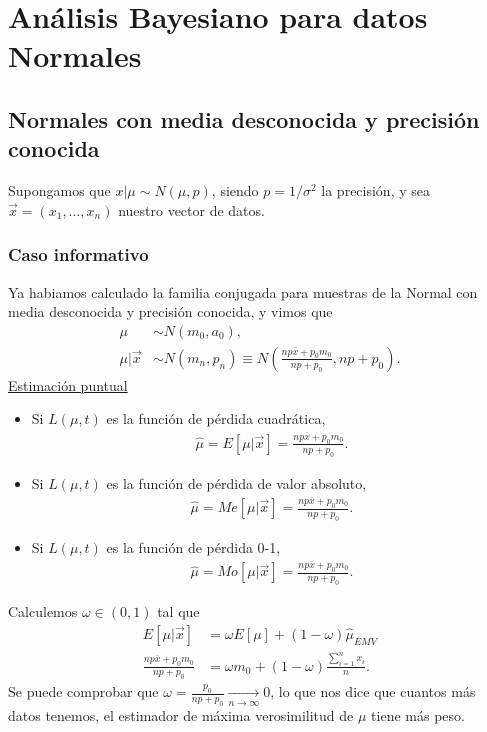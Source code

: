 \section{Análisis Bayesiano para datos Normales}

\subsection{Normales con media desconocida y precisión conocida}
Supongamos que $x | \mu \sim N(\mu,p)$, siendo $p=1/\sigma^2$ la precisión, y sea $\vec{x} = (x_1, \ldots, x_n)$ nuestro vector de datos.

\subsubsection{Caso informativo}
Ya habiamos calculado la familia conjugada para muestras de la Normal con media desconocida y precisión conocida, y vimos que
\begin{align*}
    \mu           & \sim N(m_0,a_0),                                                                           \\
    \mu | \vec{x} & \sim N(m_n,p_n) \equiv N\left(\frac{np \overline{x} + p_0m_0}{np + p_0}, np + p_0 \right).
\end{align*}
\underline{Estimación puntual}
\begin{itemize}
    \item Si $L(\mu,t)$ es la función de pérdida cuadrática,
          \begin{align*}
              \widehat{\mu} = E[\mu |  \vec{x}] = \frac{np \overline{x} + p_0m_0}{np + p_0}.
          \end{align*}
    \item Si $L(\mu,t)$ es la función de pérdida de valor absoluto,
          \begin{align*}
              \widehat{\mu} = Me[\mu |  \vec{x}] = \frac{np \overline{x} + p_0m_0}{np + p_0}.
          \end{align*}
    \item Si $L(\mu,t)$ es la función de pérdida 0-1,
          \begin{align*}
              \widehat{\mu} = Mo[\mu |  \vec{x}] = \frac{np \overline{x} + p_0m_0}{np + p_0}.
          \end{align*}
\end{itemize}
Calculemos $\omega \in (0,1)$ tal que
\begin{align*}
    E[\mu | \vec{x}]                          & = \omega E[\mu]  + (1 - \omega) \widehat{\mu }_{EMV}    \\
    \frac{np \overline{x} + p_0m_0}{np + p_0} & = \omega m_0 + (1-\omega) \frac{\sum_{i=1}^{n} x_i}{n}.
\end{align*}
Se puede comprobar que $\omega = \frac{p_0}{np + p_0} \xrightarrow[n \to \infty]{} 0$, lo que nos dice que cuantos más datos tenemos, el estimador de máxima verosimilitud de $\mu$ tiene más peso.

